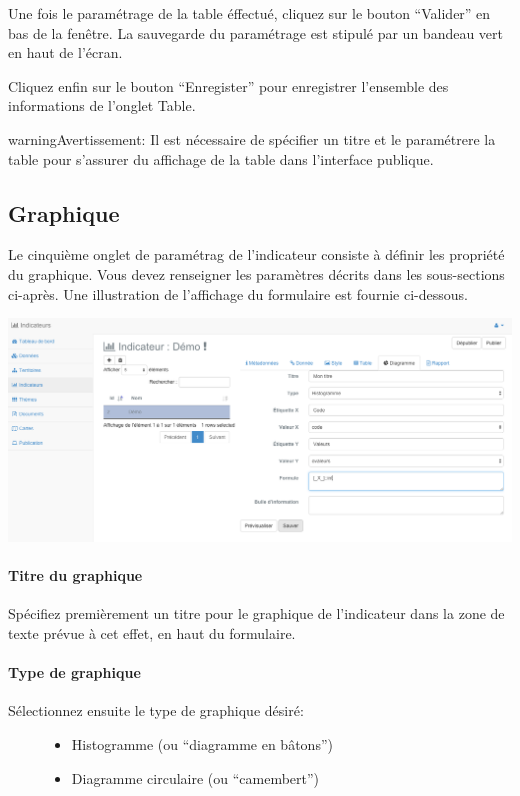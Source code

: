 \documentclass[letterpaper,10pt,french]{sphinxmanual}
\begin{document}
Une fois le paramétrage de la table éffectué, cliquez sur le bouton ``Valider'' en bas de la fenêtre. La sauvegarde du paramétrage est stipulé par un bandeau vert en haut de l'écran.

Cliquez enfin sur le bouton ``Enregister'' pour enregistrer l'ensemble des informations de l'onglet Table.

\begin{notice}{warning}{Avertissement:}
Il est nécessaire de spécifier un titre et le paramétrere la table pour s'assurer du affichage de la table dans l'interface publique.
\end{notice}


\subsection{Graphique}
\label{indicators/indicatorspanel:graphique}
Le cinquième onglet de paramétrag de l'indicateur consiste à
définir les propriété du graphique. Vous devez renseigner les
paramètres décrits dans les  sous-sections ci-après. Une illustration
de l'affichage du formulaire est fournie ci-dessous.

\includegraphics[width=1.000\linewidth]{indicator-graph.png}
\paragraph{Titre du graphique}

Spécifiez premièrement un titre pour le graphique de l'indicateur dans la zone de texte prévue à cet effet, en haut du formulaire.
\paragraph{Type de graphique}
\begin{description}
\item[{Sélectionnez ensuite le type de graphique désiré:}] \leavevmode\begin{itemize}
\item {} 
Histogramme (ou ``diagramme en bâtons'')

\item {} 
Diagramme circulaire (ou ``camembert'')

\end{itemize}

\end{description}
\end{document}
